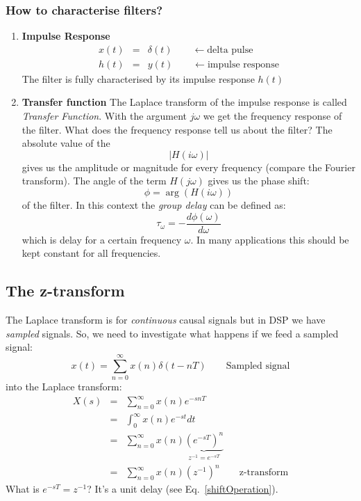 \documentclass[12pt,a4paper]{article}
\begin{document}
\subsubsection{How to characterise filters?}

\begin{enumerate}
\item{\bf Impulse Response}
\begin{eqnarray}
x(t) & = & \delta(t) \qquad \leftarrow \mbox{delta pulse} \\
h(t) & = & y(t) \qquad \leftarrow \mbox{impulse response}
\end{eqnarray}
The filter is fully characterised by its impulse response $h(t)$

\item{\bf Transfer function}
The Laplace transform of the impulse response is called
\textsl{Transfer Function}. With the argument $j\omega$ we
get the frequency
response of the filter. What does the frequency response tell us about
the filter?  The absolute value of the
\begin{equation}
|H(i \omega)|
\end{equation}
gives us the amplitude or magnitude for every frequency
(compare the Fourier transform).
The angle of the term $H(j\omega)$ gives us the phase shift:
\begin{equation}
\phi = \arg\left(H(i \omega) \right)
\end{equation}
of the filter. In this context the \textsl{group delay} can
be defined as:
\begin{equation}
\tau_{\omega} = - \frac{d \phi (\omega)}{d\omega}
\end{equation}
which is delay for a certain frequency $\omega$. In many applications
this should be kept constant for all frequencies.
\end{enumerate}

\subsection{The z-transform}
The Laplace transform is for \textsl{continuous} causal signals but in DSP
we have \textsl{sampled} signals. So, we need to investigate what happens
if we feed a sampled signal:
\begin{equation}
x(t) = \sum_{n = 0}^{\infty} x(n) \delta(t - nT) \qquad \mbox{Sampled signal} 
\end{equation} 
into the Laplace transform:
\begin{eqnarray}
X(s) & = & \sum_{n = 0}^{\infty} x(n) e^{-snT} \\
     & = & \int_{0}^{\infty} x(n) e^{-st} dt \\
     & = & \sum_{n = 0}^{\infty} x(n) \underbrace{(e^{-sT})^{n}}_{z^{-1} = e^{-sT}} \\
     & = & \sum_{n = 0}^{\infty} x(n) (z^{-1})^{n} \qquad \mbox{z-transform}
\end{eqnarray}
What is $e^{-sT} = z^{-1}$? It's a unit delay (see Eq.~\ref{shiftOperation}).
\end{document}
